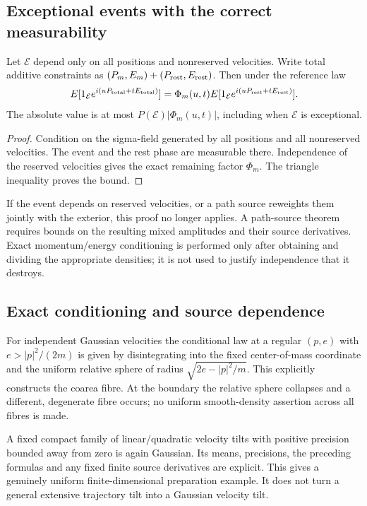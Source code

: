 \subsection{Exceptional events with the correct measurability}
\begin{proposition}
\label{prop:r33-b1-event}
Let $\mathcal E$ depend only on all positions and nonreserved velocities. Write total additive constraints as $(P_m,E_m)+(P_{\rm rest},E_{\rm rest})$. Then under the reference law
\[
 E[1_{\mathcal E}e^{i(uP_{\rm total}+tE_{\rm total})}]
 =\Phi_m(u,t)E[1_{\mathcal E}e^{i(uP_{\rm rest}+tE_{\rm rest})}].
\]
The absolute value is at most $P(\mathcal E)|\Phi_m(u,t)|$, including when $\mathcal E$ is exceptional.
\end{proposition}

\begin{proof}
Condition on the sigma-field generated by all positions and all nonreserved velocities. The event and the rest phase are measurable there. Independence of the reserved velocities gives the exact remaining factor $\Phi_m$. The triangle inequality proves the bound.
\end{proof}

If the event depends on reserved velocities, or a path source reweights them jointly with the exterior, this proof no longer applies. A path-source theorem requires bounds on the resulting mixed amplitudes and their source derivatives. Exact momentum/energy conditioning is performed only after obtaining and dividing the appropriate densities; it is not used to justify independence that it destroys.

\subsection{Exact conditioning and source dependence}
For independent Gaussian velocities the conditional law at a regular $(p,e)$ with $e>|p|^2/(2m)$ is given by disintegrating into the fixed center-of-mass coordinate and the uniform relative sphere of radius $\sqrt{2e-|p|^2/m}$. This explicitly constructs the coarea fibre. At the boundary the relative sphere collapses and a different, degenerate fibre occurs; no uniform smooth-density assertion across all fibres is made.

A fixed compact family of linear/quadratic velocity tilts with positive precision bounded away from zero is again Gaussian. Its means, precisions, the preceding formulas and any fixed finite source derivatives are explicit. This gives a genuinely uniform finite-dimensional preparation example. It does not turn a general extensive trajectory tilt into a Gaussian velocity tilt.

